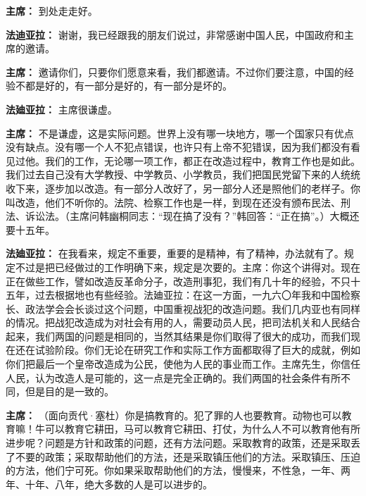 \begin{duihua}
\item[\textbf{主席：}] 到处走走好。

\item[\textbf{法迪亚拉：}] 谢谢，我已经跟我的朋友们说过，非常感谢中国人民，中国政府和主席的邀请。

\item[\textbf{主席：}] 邀请你们，只要你们愿意来看，我们都邀请。不过你们要注意，中国的经验不都是好的，有一部分是好的，有一部分是坏的。

\item[\textbf{法廸亚拉：}] 主席很谦虚。

\item[\textbf{主席：}] 不是谦虚，这是实际问题。世界上没有哪一块地方，哪一个国家只有优点没有缺点。没有哪一个人不犯点错误，也许只有上帝不犯错误，因为我们都没有看见过他。我们的工作，无论哪一项工作，都正在改造过程中，教育工作也是如此。我们过去自己没有大学教授、中学教员、小学教员，我们把国民党留下来的人统统收下来，逐步加以改造。有一部分人改好了，另一部分人还是照他们的老样子。你叫改造，他们不听你的。法院、检察工作也是一样，到现在还没有颁布民法、刑法、诉讼法。（主席问韩幽桐同志：“现在搞了没有？”韩回答：“正在搞”。）大概还要十五年。

\item[\textbf{法廸亚拉：}] 在我看来，规定不重要，重要的是精神，有了精神，办法就有了。规定不过是把已经做过的工作明确下来，规定是次要的。主席：你这个讲得对。现在正在做些工作，譬如改造反革命分子，改造刑事犯，我们有几十年的经验，不只十五年，过去根据地也有些经验。法廸亚拉：在这一方面，一九六〇年我和中国检察长、政法学会会长谈过这个问题，中国重视战犯的改造问题。我们几内亚也有同样的情况。把战犯改造成为对社会有用的人，需要动员人民，把司法机关和人民结合起来，我们两国的问题是相同的，当然其结果是你们取得了很大的成功，而我们现在还在试验阶段。你们无论在研究工作和实际工作方面都取得了巨大的成就，例如你们把最后一个皇帝改造成为公民，使他为人民的事业而工作。主席先生，你信任人民，认为改造人是可能的，这一点是完全正确的。我们两国的社会条件有所不同，但是目的是一致的。

\item[\textbf{主席：}] （面向贡代·塞杜）你是搞教育的。犯了罪的人也要教育。动物也可以教育嘛！牛可以教育它耕田，马可以教育它耕田、打仗，为什么人不可以教育他有所进步呢？问题是方针和政策的问题，还有方法问题。采取教育的政策，还是采取丢了不要的政策；采取帮助他们的方法，还是采取镇压他们的方法。采取镇压、压迫的方法，他们宁可死。你如果采取帮助他们的方法，慢慢来，不性急，一年、两年、十年、八年，绝大多数的人是可以进步的。


\end{duihua}
